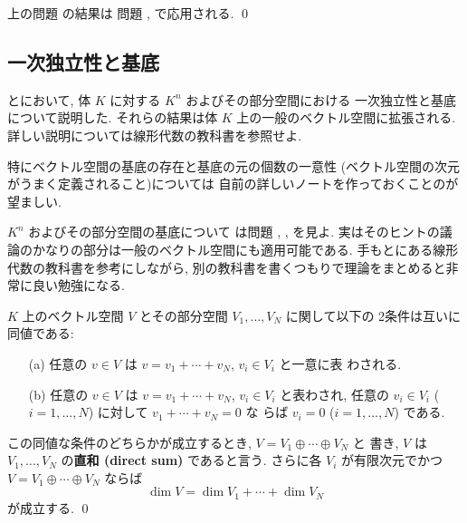 \documentclass[12pt,twoside]{jarticle}
\begin{document}
\begin{rem}
  上の問題  の結果は
  問題 ,  で応用される.
  \qed
\end{rem}


\subsection{一次独立性と基底}
\label{sec:basis}

とにおいて, 
体 $K$ に対する $K^n$ およびその部分空間における
一次独立性と基底について説明した.
それらの結果は体 $K$ 上の一般のベクトル空間に拡張される.
詳しい説明については線形代数の教科書を参照せよ.

特にベクトル空間の基底の存在と基底の元の個数の一意性
(ベクトル空間の次元がうまく定義されること)については
自前の詳しいノートを作っておくことのが望ましい.

$K^n$ およびその部分空間の基底について
は問題 , ,  を見よ.
実はそのヒントの議論のかなりの部分は一般のベクトル空間にも適用可能である.
手もとにある線形代数の教科書を参考にしながら, 
別の教科書を書くつもりで理論をまとめると非常に良い勉強になる.


\begin{question}[直和]
  $K$ 上のベクトル空間 $V$ とその部分空間 $V_1,\ldots,V_N$ に関して以下の
  2条件は互いに同値である:
  \begin{enumerate}
  \item[(a)] 任意の $v\in V$ は $v=v_1+\cdots+v_N$, $v_i\in V_i$ と一意に表
    わされる.
  \item[(b)] 任意の $v\in V$ は $v=v_1+\cdots+v_N$, $v_i\in V_i$ と表わされ,
    任意の $v_i\in V_i$ ($i=1,\ldots,N$) に対して $v_1+\cdots+v_N=0$ な
    らば $v_i=0$ ($i=1,\ldots,N$) である.
  \end{enumerate}
  この同値な条件のどちらかが成立するとき, $V=V_1\oplus\cdots\oplus V_N$ と
  書き, $V$ は $V_1,\ldots,V_N$ の{\bf 直和 (direct sum)} であると言う.
  さらに各 $V_i$ が有限次元でかつ $V=V_1\oplus\cdots\oplus V_N$ ならば
  \begin{equation*}
    \dim V = \dim V_1 + \cdots + \dim V_N
  \end{equation*}
  が成立する. \qed
\end{question}
\end{document}
